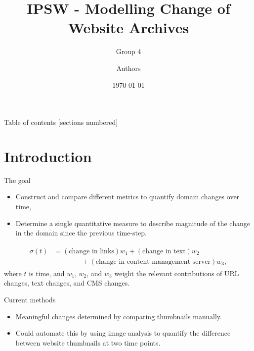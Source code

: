 \documentclass[10pt]{beamer}
\title{IPSW - Modelling Change of Website Archives}
\subtitle{Group 4}
\date{\today}
\author{Authors}
\begin{document}
\maketitle

\begin{frame}{Table of contents}
  [sections numbered]
  \tableofcontents[hideallsubsections]
\end{frame}

\section{Introduction}

\begin{frame}[fragile]{The goal}

\begin{itemize}
	\item Construct and compare different metrics to quantify domain changes over time,
	\item Determine a single quantitative measure to describe magnitude of the change in the domain since the previous time-step.
	\end{itemize} 
\begin{align}
	\begin{split}
		\sigma(t) &= (\text{change in links})w_1 + (\text{change in text})w_2 \\
		&\qquad\qquad+ (\text{change in content management server})w_3,
	\end{split}
\end{align}
where $t$ is time, and $w_1$, $w_2$, and $w_3$ weight the relevant contributions of URL changes, text changes, and CMS changes.
\end{frame}

\begin{frame}{Current methods}
 
\begin{itemize}
	\item Meaningful changes determined by comparing thumbnails manually. 
	\vspace{3ex}
	\item Could automate this by using image analysis to quantify the difference between website thumbnails at two time points. 
\end{itemize}
\end{frame}
\end{document}
